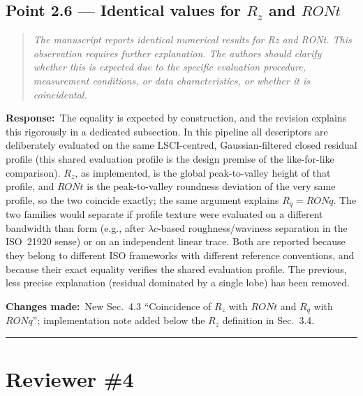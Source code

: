 \documentclass[11pt,a4paper]{article}
\newenvironment{reviewercomment}%
{\par\medskip\noindent\begin{quotation}\itshape\color{black!70}}%
{\end{quotation}\medskip}
\newcommand{\response}{\par\noindent\textbf{Response:}\ }
\newcommand{\changes}{\par\noindent\textbf{Changes made:}\ }
\begin{document}
\subsection*{Point 2.6 --- Identical values for $R_z$ and $RONt$}
\begin{reviewercomment}
The manuscript reports identical numerical results for Rz and RONt. This observation requires further explanation. The authors should clarify whether this is expected due to the specific evaluation procedure, measurement conditions, or data characteristics, or whether it is coincidental.
\end{reviewercomment}
\response The equality is expected by construction, and the revision explains this rigorously in a dedicated subsection. In this pipeline all descriptors are deliberately evaluated on the same LSCI-centred, Gaussian-filtered closed residual profile (this shared evaluation profile is the design premise of the like-for-like comparison). $R_z$, as implemented, is the global peak-to-valley height of that profile, and $RONt$ is the peak-to-valley roundness deviation of the very same profile, so the two coincide exactly; the same argument explains $R_q = RONq$. The two families would separate if profile texture were evaluated on a different bandwidth than form (e.g., after $\lambda c$-based roughness/waviness separation in the ISO~21920 sense) or on an independent linear trace. Both are reported because they belong to different ISO frameworks with different reference conventions, and because their exact equality verifies the shared evaluation profile. The previous, less precise explanation (residual dominated by a single lobe) has been removed.
\changes New Sec.~4.3 ``Coincidence of $R_z$ with $RONt$ and $R_q$ with $RONq$''; implementation note added below the $R_z$ definition in Sec.~3.4.

\bigskip
\hrule
\section*{Reviewer \#4}
\end{document}
